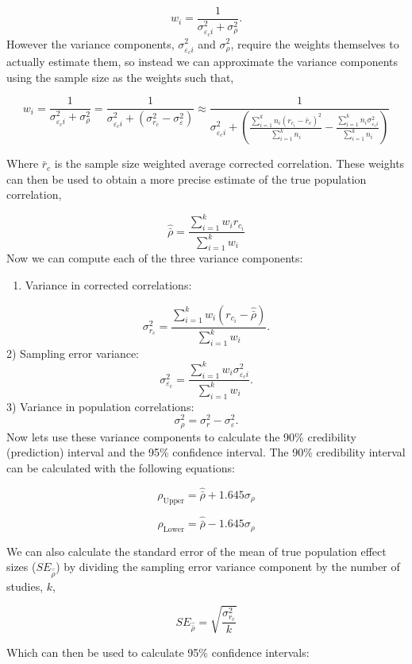 \documentclass[
  letterpaper,
  DIV=11,
  numbers=noendperiod]{scrreprt}
\providecommand{\tightlist}{%
  \setlength{\itemsep}{0pt}\setlength{\parskip}{0pt}}\usepackage{longtable,booktabs,array}
\begin{document}
\[
w_i = \frac{1}{\sigma^2_{\varepsilon_ci}+\sigma^2_\rho}.
\] However the variance components, \(\sigma^2_{\varepsilon_ci}\) and
\(\sigma^2_\rho\), require the weights themselves to actually estimate
them, so instead we can approximate the variance components using the
sample size as the weights such that,

\[ 
w_i =\frac{1}{\sigma^2_{\varepsilon_ci}+\sigma_\rho^2}= \frac{1}{\sigma^2_{\varepsilon_ci}+(\sigma^2_{r_c}-\sigma^2_{\varepsilon})} \approx \frac{1}{\sigma^2_{\varepsilon_ci}+\left(\frac{\sum^k_{i=1}n_i(r_{c_i} - \bar{r}_c)^2}{\sum^k_{i=1}n_i}-\frac{\sum^k_{i=1}n_i\sigma^2_{\varepsilon_ci}}{\sum^k_{i=1}n_i}\right)} 
\]

Where \(\bar{r}_c\) is the sample size weighted average corrected
correlation. These weights can then be used to obtain a more precise
estimate of the true population correlation,

\[
\hat{\bar{\rho}}=\frac{\sum_{i=1}^k w_i r_{c_i}}{\sum_{i=1}^k w_i}
\] Now we can compute each of the three variance components:

\begin{enumerate}
\def\labelenumi{\arabic{enumi})}
\tightlist
\item
  Variance in corrected correlations:
\end{enumerate}

\[
\sigma^2_{r_c}=\frac{\sum^k_{i=1}w_i(r_{c_i} - \hat{\bar{\rho}})}{\sum^k_{i=1}w_i}.
\] 2) Sampling error variance: \[
\sigma^2_{\varepsilon_c} = \frac{\sum^k_{i=1}w_i\sigma^2_{\varepsilon_ci}}{\sum^k_{i=1}w_i}.
\] 3) Variance in population correlations: \[
\sigma^2_\rho = \sigma^2_r - \sigma^2_{\varepsilon}.
\] Now lets use these variance components to calculate the 90\%
credibility (prediction) interval and the 95\% confidence interval. The
90\% credibility interval can be calculated with the following
equations:

\[
\rho_\text{Upper} = \hat{\bar{\rho}} + 1.645\sigma_\rho
\]

\[
\rho_\text{Lower} = \hat{\bar{\rho}} - 1.645\sigma_\rho
\]

We can also calculate the standard error of the mean of true population
effect sizes (\(SE_{\hat{\bar{\rho}}}\)) by dividing the sampling error
variance component by the number of studies, \(k\),

\[
SE_{\hat{\bar{\rho}}} = \sqrt{\frac{\sigma^2_{r_c}}{k}}
\]

Which can then be used to calculate 95\% confidence intervals:
\end{document}
